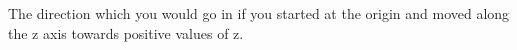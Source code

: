 The direction which you would go in if you started at
the origin and moved along the z axis towards positive values
of z.